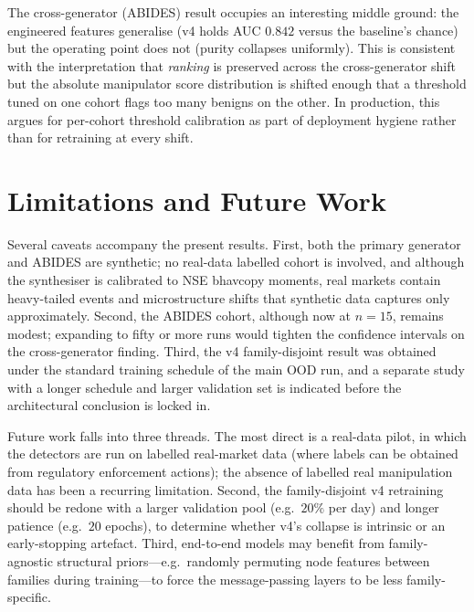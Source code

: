 \documentclass[10pt,twocolumn,letterpaper]{article}
\begin{document}
The cross-generator (ABIDES) result occupies an interesting middle
ground: the engineered features generalise (v4 holds AUC \(0.842\)
versus the baseline's chance) but the operating point does not (purity
collapses uniformly). This is consistent with the interpretation that
\emph{ranking} is preserved across the cross-generator shift but the
absolute manipulator score distribution is shifted enough that a
threshold tuned on one cohort flags too many benigns on the other. In
production, this argues for per-cohort threshold calibration as part of
deployment hygiene rather than for retraining at every shift.

\section{Limitations and Future Work}
\label{sec:lim}

Several caveats accompany the present results. First, both the primary
generator and ABIDES are synthetic; no real-data labelled cohort is
involved, and although the synthesiser is calibrated to NSE bhavcopy
moments, real markets contain heavy-tailed events and microstructure
shifts that synthetic data captures only approximately. Second, the
ABIDES cohort, although now at \(n=15\), remains modest; expanding to
fifty or more runs would tighten the confidence intervals on the
cross-generator finding. Third, the v4 family-disjoint result was
obtained under the standard training schedule of the main OOD run, and
a separate study with a longer schedule and larger validation set is
indicated before the architectural conclusion is locked in.

Future work falls into three threads. The most direct is a real-data
pilot, in which the detectors are run on labelled real-market data
(where labels can be obtained from regulatory enforcement actions); the
absence of labelled real manipulation data has been a recurring
limitation. Second, the family-disjoint v4 retraining should be redone
with a larger validation pool (e.g.\ \(20\%\) per day) and longer
patience (e.g.\ \(20\) epochs), to determine whether v4's collapse is
intrinsic or an early-stopping artefact. Third, end-to-end models may
benefit from family-agnostic structural priors---e.g.\ randomly
permuting node features between families during training---to force
the message-passing layers to be less family-specific.
\end{document}
